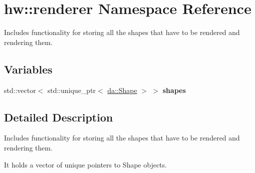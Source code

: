 \hypertarget{namespacehw_1_1renderer}{}\section{hw\+:\+:renderer Namespace Reference}
\label{namespacehw_1_1renderer}


Includes functionality for storing all the shapes that have to be rendered and rendering them.  


\subsection*{Variables}
\begin{DoxyCompactItemize}
\item 
\mbox{\label{namespacehw_1_1renderer_a22959793e197ca9e4e2573e13e16b84b}} 
std\+::vector$<$ std\+::unique\+\_\+ptr$<$ \mbox{\hyperlink{classdummy__api_1_1Shape}{da\+::\+Shape}} $>$ $>$ {\bfseries shapes}
\end{DoxyCompactItemize}


\subsection{Detailed Description}
Includes functionality for storing all the shapes that have to be rendered and rendering them. 

It holds a vector of unique pointers to Shape objects. 